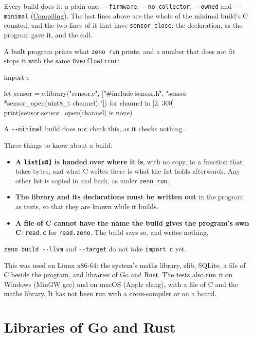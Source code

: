 Every build does it: a plain one, \verb|--firmware|,
\verb|--no-collector|, \verb|--owned| and \verb|--minimal|
(\hyperref[ch-compiling]{Compiling}). The last lines above are the
whole of the minimal build's C counted, and the two lines of it that
have \verb|sensor_close|: the declaration, as the program gave it, and
the call.

A built program prints what \verb|zeno run| prints, and a number that
does not fit stops it with the same \verb|OverflowError|:

\begin{zeno}[file=channel.zeno, dir=sensor, fails=yes, cmd=zeno run {file} ;; zeno build {file} ;; ./channel]
import c

let sensor = c.library("sensor.c", ["#include \"sensor.h\"", "sensor *sensor_open(uint8_t channel);"])
for channel in [2, 300] {
    print(sensor.sensor_open(channel) is none)
}
\end{zeno}

A \verb|--minimal| build does not check this, as it checks nothing.

Three things to know about a build:

\begin{itemize}
\item \textbf{A \texttt{list[u8]} is handed over where it is}, with no
  copy, to a function that takes bytes, and what C writes there is
  what the list holds afterwards. Any other list is copied in and
  back, as under \verb|zeno run|.
\item \textbf{The library and its declarations must be written out}
  in the program as texts, so that they are known while it builds.
\item \textbf{A file of C cannot have the name the build gives the
  program's own C}: \verb|read.c| for \verb|read.zeno|. The build says
  so, and writes nothing.
\end{itemize}

\verb|zeno build --llvm| and \verb|--target| do not take
\verb|import c| yet.

\begin{note}
This was used on Linux x86-64: the system's maths library, zlib,
SQLite, a file of C beside the program, and libraries of Go and Rust.
The tests also run it on Windows (MinGW gcc) and on macOS (Apple
clang), with a file of C and the maths library. It has not been run
with a cross-compiler or on a board.
\end{note}

\section{Libraries of Go and Rust}

